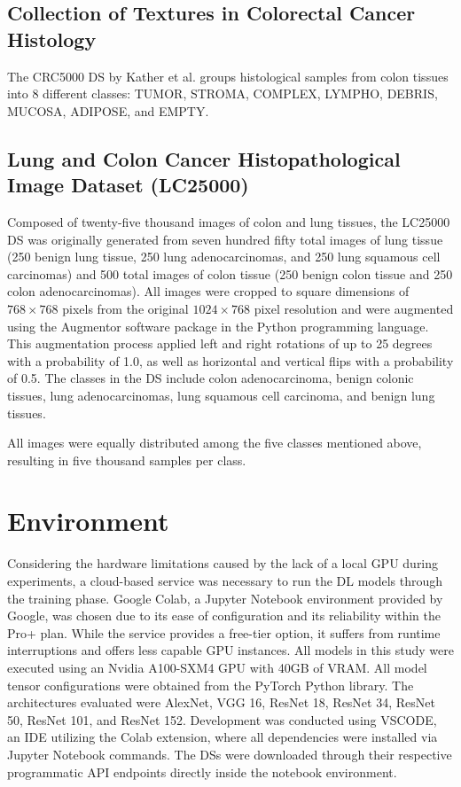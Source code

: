 \subsection{Collection of Textures in Colorectal Cancer Histology}
\label{subsec_crc5000}
The \gls{CRC5000} \gls{DS} by Kather et al. \cite{kather_2016_53169} groups histological samples from colon tissues into 8 different classes: TUMOR, STROMA, COMPLEX, LYMPHO, DEBRIS, MUCOSA, ADIPOSE, and EMPTY. 
 
\subsection{Lung and Colon Cancer Histopathological Image Dataset (LC25000)}
\label{subsec_lc25000}
Composed of twenty-five thousand images of colon and lung tissues, the \gls{LC25000} \gls{DS} was originally generated from seven hundred fifty total images of lung tissue (250 benign lung tissue, 250 lung adenocarcinomas, and 250 lung squamous cell carcinomas) and 500 total images of colon tissue (250 benign colon tissue and 250 colon adenocarcinomas). All images were cropped to square dimensions of $768 \times 768$ pixels from the original $1024 \times 768$ pixel resolution and were augmented using the Augmentor software package in the Python programming language. This augmentation process applied left and right rotations of up to 25 degrees with a probability of 1.0, as well as horizontal and vertical flips with a probability of 0.5. The classes in the \gls{DS} include colon adenocarcinoma, benign colonic tissues, lung adenocarcinomas, lung squamous cell carcinoma, and benign lung tissues. 

All images were equally distributed among the five classes mentioned above, resulting in five thousand samples per class.

\section{Environment}
\label{sec_environment}
Considering the hardware limitations caused by the lack of a local \gls{GPU} during experiments, a cloud-based service was necessary to run the \gls{DL} models through the training phase. Google Colab, a Jupyter Notebook environment provided by Google, was chosen due to its ease of configuration and its reliability within the Pro+ plan. While the service provides a free-tier option, it suffers from runtime interruptions and offers less capable \gls{GPU} instances. All models in this study were executed using an Nvidia A100-SXM4 GPU with 40GB of VRAM.
All model tensor configurations were obtained from the PyTorch Python library. The architectures evaluated were AlexNet, \gls{VGG} 16, ResNet 18, ResNet 34, ResNet 50, ResNet 101, and ResNet 152.
Development was conducted using \gls{VSCODE}, an \gls{IDE} utilizing the Colab extension, where all dependencies were installed via Jupyter Notebook commands. The \glspl{DS} were downloaded through their respective programmatic \gls{API} endpoints directly inside the notebook environment.

